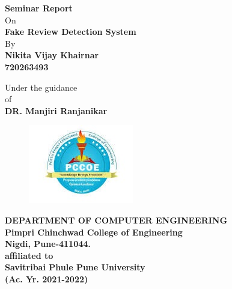 \begin{center}
{\Huge \textbf{Seminar Report}}\\
\vspace{0.2in}
{On}\\
\vspace{0.2in}
{\Huge  \textbf{Fake Review Detection System}}\\
\vspace{0.1in}
\vspace{0.2in}
By\\
\vspace{0.4in}
\textbf{ Nikita Vijay Khairnar } \\

 \textbf{720263493}  

\vspace{0.2in}
Under the guidance\\
 of\\
 \vspace{0.2in}
\textbf{DR. Manjiri Ranjanikar}\\
\vspace{0.8in}

\begin{figure}[h]
\centerline{ \includegraphics[scale=0.8]{Logo.JPG}  }
\end{figure}

\textbf{{\large DEPARTMENT OF COMPUTER ENGINEERING}}\\
\textbf{{\large Pimpri Chinchwad College of Engineering }}\\
\textbf{{\large Nigdi, Pune-411044.}}\\
\textbf{{\large affiliated to \\Savitribai Phule Pune University}}\\
\textbf{{\large (Ac. Yr. 2021-2022) }}\\
\end{center}
